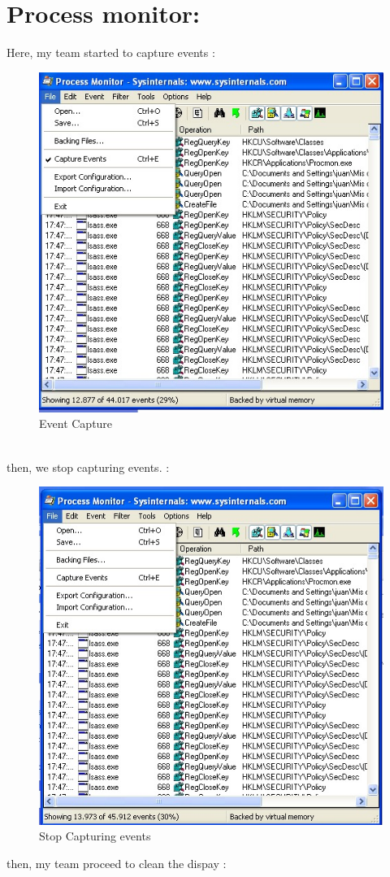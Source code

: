 \documentclass[10pt,a4paper]{article} %
\begin{document}
    \title{\rmfamily\normalfont{}}
    \author{}
    \date{\today}

    \maketitle


    \section{Process monitor:}
        Here, my team started to capture events :
        \\
        \begin{figure}[h]
            \centering
            \includegraphics[width=0.4\linewidth]{capturandoeventos.jpeg}
            \caption{Event Capture}
            \label{1}
        \end{figure}
        \\
        then, we stop capturing events. :
        \begin{figure}[h]
            \centering
            \includegraphics[width=0.4\linewidth]{fig2.jpeg}
            \caption{Stop Capturing events}
            \label{2}
        \end{figure}
        \newpage
        then, my team proceed to clean the dispay :
\end{document}
